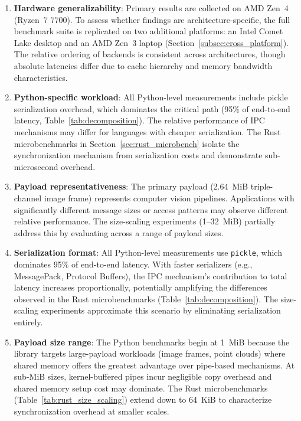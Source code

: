 \begin{enumerate}
    \item \textbf{Hardware generalizability}: Primary results are collected on AMD Zen~4 (Ryzen~7 7700). To assess whether findings are architecture-specific, the full benchmark suite is replicated on two additional platforms: an Intel Comet Lake desktop and an AMD Zen~3 laptop (Section~\ref{subsec:cross_platform}). The relative ordering of backends is consistent across architectures, though absolute latencies differ due to cache hierarchy and memory bandwidth characteristics.

    \item \textbf{Python-specific workload}: All Python-level measurements include pickle serialization overhead, which dominates the critical path (95\% of end-to-end latency, Table~\ref{tab:decomposition}). The relative performance of IPC mechanisms may differ for languages with cheaper serialization. The Rust microbenchmarks in Section~\ref{sec:rust_microbench} isolate the synchronization mechanism from serialization costs and demonstrate sub-microsecond overhead.

    \item \textbf{Payload representativeness}: The primary payload (2.64~MiB triple-channel image frame) represents computer vision pipelines. Applications with significantly different message sizes or access patterns may observe different relative performance. The size-scaling experiments (1--32~MiB) partially address this by evaluating across a range of payload sizes.

    \item \textbf{Serialization format}: All Python-level measurements use \texttt{pickle}, which dominates 95\% of end-to-end latency. With faster serializers (e.g., MessagePack, Protocol Buffers), the IPC mechanism's contribution to total latency increases proportionally, potentially amplifying the differences observed in the Rust microbenchmarks (Table~\ref{tab:decomposition}). The size-scaling experiments approximate this scenario by eliminating serialization entirely.

    \item \textbf{Payload size range}: The Python benchmarks begin at 1~MiB because the library targets large-payload workloads (image frames, point clouds) where shared memory offers the greatest advantage over pipe-based mechanisms. At sub-MiB sizes, kernel-buffered pipes incur negligible copy overhead and shared memory setup cost may dominate. The Rust microbenchmarks (Table~\ref{tab:rust_size_scaling}) extend down to 64~KiB to characterize synchronization overhead at smaller scales.
\end{enumerate}

